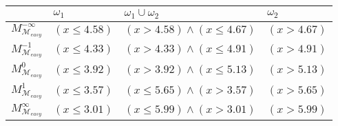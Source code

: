 \begin{tabular}{llll}
\toprule
 & $\omega_{1}$ & $\omega_{1} \cup \omega_{2}$ & $\omega_{2}$ \\
\midrule
$M^{-\infty}_{\mathcal{M}_{easy}}$ & $(x \leq 4.58)$ & $(x > 4.58) \wedge (x \leq 4.67)$ & $(x > 4.67)$ \\
$M^{-1}_{\mathcal{M}_{easy}}$ & $(x \leq 4.33)$ & $(x > 4.33) \wedge (x \leq 4.91)$ & $(x > 4.91)$ \\
$M^{0}_{\mathcal{M}_{easy}}$ & $(x \leq 3.92)$ & $(x > 3.92) \wedge (x \leq 5.13)$ & $(x > 5.13)$ \\
$M^{1}_{\mathcal{M}_{easy}}$ & $(x \leq 3.57)$ & $(x \leq 5.65) \wedge (x > 3.57)$ & $(x > 5.65)$ \\
$M^\infty_{\mathcal{M}_{easy}}$ & $(x \leq 3.01)$ & $(x \leq 5.99) \wedge (x > 3.01)$ & $(x > 5.99)$ \\
\bottomrule
\end{tabular}
